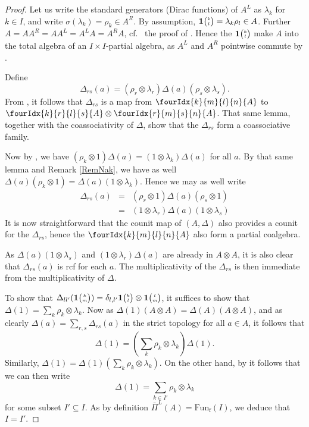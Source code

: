 \documentclass[10pt]{article}
\DeclareMathOperator{\fin}{\mathrm{f}}
\newcommand{\Fun}{\mathrm{Fun}}
\newcommand{\Grt}[3]{#1{\tiny {\begin{pmatrix} #2\\#3\end{pmatrix}}}}
\newcommand{\UnitC}[2]{\Grt{\mathbf{1}}{#1}{#2}}
\newcommand{\Gr}[5]{\fourIdx{#2}{#4}{#3}{#5}{#1}}%
\theoremstyle{definition}
\numberwithin{equation}{section}
\begin{document}
\begin{proof} Let us write the standard generators (Dirac functions) of $A^L$ as $\lambda_k$ for $k\in I$, and write $\sigma(\lambda_k) = \rho_k\in A^R$. By assumption, $\UnitC{k}{l} = \lambda_k\rho_l\in A$. Further $A= AA^R = AA^L = A^LA=A^RA$, cf.~ the proof of \cite[Theorem 3.13]{Boh1}. Hence the $\UnitC{k}{l}$ make $A$ into the total algebra of an $I\times I$-partial algebra, as $A^L$ and $A^R$ pointwise commute by \cite[Lemma 3.5]{Boh1}. 

Define \[\Delta_{rs}(a) = (\rho_r\otimes \lambda_r)\Delta(a)(\rho_s\otimes \lambda_s).\] From \cite[Lemma 3.3]{Boh1}, it follows that $\Delta_{rs}$ is a map from $\Gr{A}{k}{l}{m}{n}$ to $\Gr{A}{k}{l}{r}{s}\otimes \Gr{A}{r}{s}{m}{n}$. That same lemma, together with the coassociativity of $\Delta$, show that the $\Delta_{rs}$ form a coassociative family.  

Now by \cite[Lemma 3.9]{Boh1}, we have $(\rho_k\otimes 1)\Delta(a) = (1\otimes \lambda_k)\Delta(a)$ for all $a$. By that same lemma and Remark \ref{RemNak}, we have as well $\Delta(a)(\rho_k\otimes 1) = \Delta(a)(1\otimes \lambda_k)$. Hence we may as well write \begin{eqnarray*} \Delta_{rs}(a) &=& (\rho_r\otimes 1)\Delta(a)(\rho_s\otimes 1) \\ &=& (1\otimes \lambda_r)\Delta(a)(1\otimes \lambda_s)\end{eqnarray*}  It is now straightforward that the counit map of $(A,\Delta)$ also provides a counit for the $\Delta_{rs}$, hence the $\Gr{A}{k}{l}{m}{n}$ also form a partial coalgebra. 

As $\Delta(a)(1\otimes \lambda_s)$ and $(1\otimes \lambda_r)\Delta(a)$ are already in $A\otimes A$, it is also clear that $\Delta_{rs}(a)$ is rcf for each $a$. The multiplicativity of the $\Delta_{rs}$ is then immediate from the multiplicativity of $\Delta$.

To show that $\Delta_{ll'}(\UnitC{k}{m}) = \delta_{l,l'} \UnitC{k}{l}\otimes \UnitC{l}{m}$, it suffices to show that $\Delta(1) = \sum_k \rho_k\otimes \lambda_k$. Now as $\Delta(1)(A\otimes A)  = \Delta(A)(A\otimes A)$, and as clearly $\Delta(a) = \sum_{r,s}\Delta_{rs}(a)$ in the strict topology for all $a\in A$, it follows that \[\Delta(1) = \left(\sum_k \rho_k\otimes \lambda_k\right)\Delta(1).\]  Similarly, $\Delta(1) = \Delta(1)\left(\sum_k\rho_k\otimes \lambda_k\right)$. On the other hand, by \cite[Lemma 4.10]{Boh1} it follows that we can then write \[\Delta(1) = \sum_{k\in I'} \rho_k\otimes \lambda_k\] for some subset $I'\subseteq I$. As by definition $\bar{\Pi}^L(A) = \Fun_{\fin}(I)$, we deduce that $I=I'$. 


\end{proof}
\end{document}
